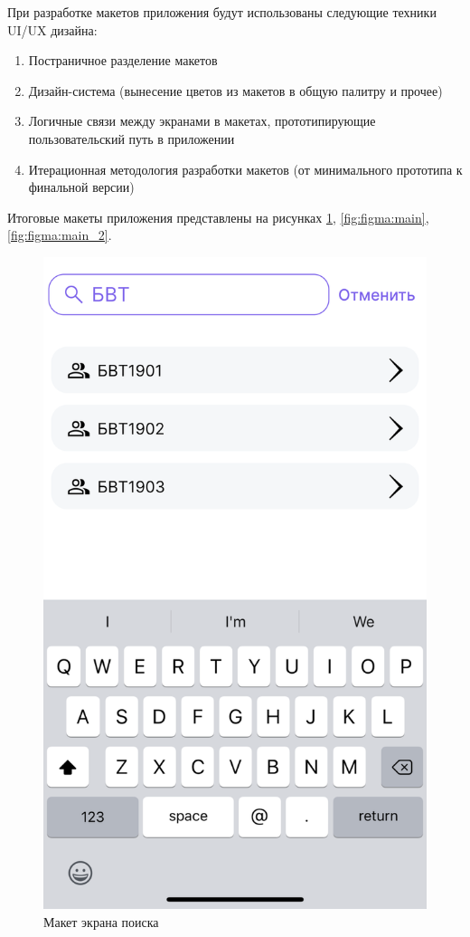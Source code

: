 При разработке макетов приложения будут использованы следующие техники UI/UX дизайна:
\begin{enumerate}
  \item Постраничное разделение макетов
  \item Дизайн-система (вынесение цветов из макетов в общую палитру и прочее)
  \item Логичные связи между экранами в макетах, прототипирующие пользовательский путь в приложении
  \item Итерационная методология разработки макетов (от минимального прототипа к финальной версии)
\end{enumerate}

Итоговые макеты приложения представлены на рисунках 
\ref{fig:figma:search}, \ref{fig:figma:main}, \ref{fig:figma:main_2}.

\begin{figure}
  \centering
  \includegraphics[height=0.3\pdfpageheight]{images/figma/search.png}
  \caption{Макет экрана поиска}
  \label{fig:figma:search}
\end{figure}

